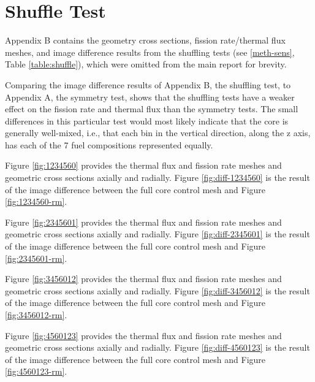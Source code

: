 \section{Shuffle Test}
\label{app-shuf}
Appendix B contains the geometry cross sections, fission rate/thermal flux meshes, and image difference results from the shuffling tests (see \autoref{meth-sens}, Table \ref{table:shuffle}), which were omitted from the main report for brevity.

Comparing the image difference results of Appendix B, the shuffling test, to Appendix A, the symmetry test, shows that the shuffling tests have a weaker effect on the fission rate and thermal flux than the symmetry tests.  The small differences in this particular test would most likely indicate that the core is generally well-mixed, i.e., that each bin in the vertical direction, along the z axis, has each of the 7 fuel compositions represented equally.





Figure \ref{fig:1234560} provides the thermal flux and fission rate meshes and geometric cross sections axially and radially.  Figure \ref{fig:diff-1234560} is the result of the image difference between the full core control mesh and Figure \ref{fig:1234560-rm}.




Figure \ref{fig:2345601} provides the thermal flux and fission rate meshes and geometric cross sections axially and radially.  Figure \ref{fig:diff-2345601} is the result of the image difference between the full core control mesh and Figure \ref{fig:2345601-rm}.




Figure \ref{fig:3456012} provides the thermal flux and fission rate meshes and geometric cross sections axially and radially.  Figure \ref{fig:diff-3456012} is the result of the image difference between the full core control mesh and Figure \ref{fig:3456012-rm}.




Figure \ref{fig:4560123} provides the thermal flux and fission rate meshes and geometric cross sections axially and radially.  Figure \ref{fig:diff-4560123} is the result of the image difference between the full core control mesh and Figure \ref{fig:4560123-rm}.




